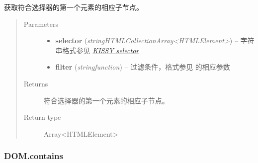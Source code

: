 \documentclass[letterpaper,10pt,english]{sphinxmanual}
\begin{document}
\begin{fulllineitems}
\label{api/core/dom/children:DOM.children}
获取符合选择器的第一个元素的相应子节点。
\begin{quote}\begin{description}
\item[{Parameters}] \leavevmode\begin{itemize}
\item {}
\textbf{selector} (\emph{string\textbar{}HTMLCollection\textbar{}Array\textless{}HTMLElement\textgreater{}}) -- 字符串格式参见 {\hyperref[api/core/dom/selector:dom-selector]{\emph{KISSY selector}}}

\item {}
\textbf{filter} (\emph{string\textbar{}function}) -- 过滤条件，格式参见 {\hyperref[api/core/dom/filter:DOM.filter]{}} 的相应参数

\end{itemize}

\item[{Returns}] \leavevmode
符合选择器的第一个元素的相应子节点。

\item[{Return type}] \leavevmode
Array\textless{}HTMLElement\textgreater{}

\end{description}\end{quote}

\end{fulllineitems}



\subsubsection{DOM.contains}
\label{api/core/dom/contains:dom-contains}\label{api/core/dom/contains::doc}
\end{document}

